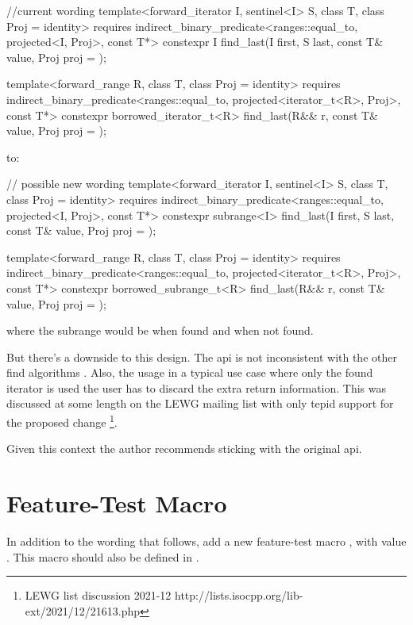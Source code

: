 \documentclass[ebook,10pt,oneside,openany,final]{memoir}
\begin{document}
\begin{itemdecl}
    //current wording
    template<forward_iterator I, sentinel<I> S, class T, class Proj = identity>
      requires indirect_binary_predicate<ranges::equal_to, projected<I, Proj>, const T*>
      constexpr I find_last(I first, S last, const T& value, Proj proj = {});

    template<forward_range R, class T, class Proj = identity>
      requires indirect_binary_predicate<ranges::equal_to, projected<iterator_t<R>, Proj>, const T*>
      constexpr borrowed_iterator_t<R>
        find_last(R&& r, const T& value, Proj proj = {});
\end{itemdecl}

to:

\begin{itemdecl}
    // possible new wording
    template<forward_iterator I, sentinel<I> S, class T, class Proj = identity>
      requires indirect_binary_predicate<ranges::equal_to, projected<I, Proj>, const T*>
      constexpr subrange<I> find_last(I first, S last, const T& value, Proj proj = {});

    template<forward_range R, class T, class Proj = identity>
      requires indirect_binary_predicate<ranges::equal_to, projected<iterator_t<R>, Proj>, const T*>
      constexpr borrowed_subrange_t<R>
        find_last(R&& r, const T& value, Proj proj = {});
\end{itemdecl}

where the subrange would be \tcode{[i, last)} when found and \tcode{[last, last)}
when not found.

But there's a downside to this design.  The api is not inconsistent with the other
find algorithms . Also, the usage in a typical use case
where only the found iterator is used the user has to discard the extra return
information. This was discussed at some length on the LEWG mailing list with only
tepid support for the proposed change \footnote{LEWG list discussion 2021-12 http://lists.isocpp.org/lib-ext/2021/12/21613.php}.

Given this context the author recommends sticking with the original api.

\section{Feature-Test Macro}

In addition to the wording that follows, add a new feature-test macro
, with value .  This macro should also be
defined in .

\newcommand{\indexhdr}[1]{}
\newcommand{\indexlibrarymember}[2]{
}




\end{document}
